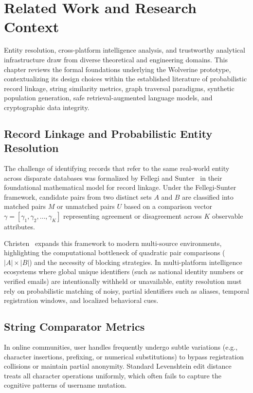 \chapter{Related Work and Research Context}
\label{ch:related-work}

Entity resolution, cross-platform intelligence analysis, and trustworthy analytical infrastructure draw from diverse theoretical and engineering domains. This chapter reviews the formal foundations underlying the Wolverine prototype, contextualizing its design choices within the established literature of probabilistic record linkage, string similarity metrics, graph traversal paradigms, synthetic population generation, safe retrieval-augmented language models, and cryptographic data integrity.

\section{Record Linkage and Probabilistic Entity Resolution}
\label{sec:related-record-linkage}
The challenge of identifying records that refer to the same real-world entity across disparate databases was formalized by Fellegi and Sunter~\cite{fellegi1969theory} in their foundational mathematical model for record linkage. Under the Fellegi-Sunter framework, candidate pairs from two distinct sets $A$ and $B$ are classified into matched pairs $M$ or unmatched pairs $U$ based on a comparison vector $\gamma = [\gamma_1, \gamma_2, \dots, \gamma_K]$ representing agreement or disagreement across $K$ observable attributes.

Christen~\cite{christen2012data} expands this framework to modern multi-source environments, highlighting the computational bottleneck of quadratic pair comparisons ($|A| \times |B|$) and the necessity of blocking strategies. In multi-platform intelligence ecosystems where global unique identifiers (such as national identity numbers or verified emails) are intentionally withheld or unavailable, entity resolution must rely on probabilistic matching of noisy, partial identifiers such as aliases, temporal registration windows, and localized behavioral cues.

\section{String Comparator Metrics}
\label{sec:related-string-metrics}
In online communities, user handles frequently undergo subtle variations (e.g., character insertions, prefixing, or numerical substitutions) to bypass registration collisions or maintain partial anonymity. Standard Levenshtein edit distance treats all character operations uniformly, which often fails to capture the cognitive patterns of username mutation.

